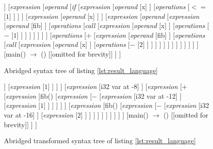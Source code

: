 \begin{figure}
\begin{forest}
[\textit{file}
	[{fib() $\rightarrow$ i32}
		[\textit{arguments}
			[{x : i32}]
		]
		[\textit{expression}
			[\textit{operand}
				[\textit{if}
					[\textit{expression}
						[\textit{operand}
							[x]
						]
						[\textit{operations}
							[{$<=$}
								[{$1$}]
							]
						]
					]
					[\textit{expression}
						[\textit{operand}
							[x]
						]
					]
					[\textit{expression}
						[\textit{operand}
							[\textit{expression}
								[\textit{operand}
									[fib]
								]
								[\textit{operations}
									[\textit{call}
										[\textit{expression}
											[\textit{operand}
												[x]
											]
											[\textit{operations}
												[{$-$}
													[{$1$}]
												]
											]
										]
									]
								]
							]
						]
						[\textit{operations}
							[{$+$}
								[\textit{expression}
									[\textit{operand}
										[fib]
									]
									[\textit{operations}
										[\textit{call}
											[\textit{expression}
												[\textit{operand}
													[x]
												]
												[\textit{operations}
													[{$-$}
														[{$2$}]
													]
												]
											]
										]
									]
								]
							]
						]
					]
				]
			]
		]
	]
	[{main() $\rightarrow$ ()}
		[{[omitted for brevity]}]
	]
]
\end{forest}
\caption{Abridged syntax tree of listing \ref{lst:result_language}}
\label{fig:result_language_parser_tree}
\end{figure}

\begin{figure}
\begin{forest}
[\textit{file}
	[{fib() $\rightarrow$ i32}
		[\textit{expression}
			[\textit{if}
				[\textit{expression} : bool
					[{$<=$}
						[\textit{expression}
							[i32 var at -8]
						]
						[\textit{expression}
							[$1$]
						]
					]
				]
				[\textit{expression}
					[i32 var at -8]
				]
				[\textit{expression}
					[{$+$}
						[\textit{expression}
							[fib()
								[\textit{expression}
									[{$-$}
										[\textit{expression}
											[i32 var at -12]
										]
										[\textit{expression}
											[$1$]
										]
									]
								]
							]
						]
						[\textit{expression}
							[fib()
								[\textit{expression}
									[{$-$}
										[\textit{expression}
											[i32 var at -16]
										]
										[\textit{expression}
											[$2$]
										]
									]
								]
							]
						]
					]
				]
			]
		]
	]
	[{main() $\rightarrow$ ()}
		[{[omitted for brevity]}]
	]
]
\end{forest}
\caption{Abridged transformed syntax tree of listing \ref{lst:result_language}}
\label{fig:result_language_transformed_tree}
\end{figure}

